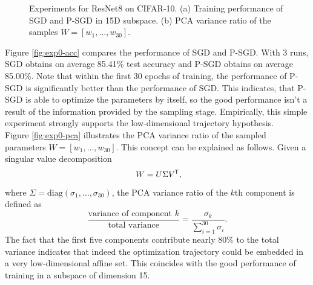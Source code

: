 \documentclass[11pt, a4paper]{article}
\newcommand*{\tr}{^{\mkern-1.5mu\mathsf{T}}}
\begin{document}
\begin{figure}[!h]
\centering
{}
\caption{\centering Experiments for ResNet8 on CIFAR-10. (a) Training performance of SGD and P-SGD in 15D subspace. (b) PCA variance ratio of the samples $W = [w_1, \dots, w_{30}]$. }
\label{fig:exp1}
\end{figure}

Figure \ref{fig:exp0-acc} compares the performance of SGD and P-SGD. With 3 runs, SGD obtains on average 85.41\% test accuracy and P-SGD obtains on average 85.00\%. Note that within the first 30 epochs of training, the performance of P-SGD is significantly better than the performance of SGD.  This indicates, that P-SGD is able to optimize the parameters by itself, so the good performance isn't a result of the information provided by the sampling stage. Empirically, this simple experiment strongly supports the low-dimensional trajectory hypothesis. \\

Figure \ref{fig:exp0-pca} illustrates the PCA variance ratio of the sampled parameters $W = [w_1, \dots, w_{30}]$. This concept can be explained as follows. Given a singular value decomposition
\[ W = U \Sigma V\tr, \]
where $\Sigma = \text{diag}(\sigma_1, \dots, \sigma_{30})$, the PCA variance ratio of the $k$th component is defined as
\[ \frac{\text{variance of component } k}{\text{total variance}} = \frac{\sigma_k}{\sum_{i=1}^{30}\sigma_i}. \]
The fact that the first five components contribute nearly 80\% to the total variance indicates that indeed the optimization trajectory could be embedded in a very low-dimensional affine set. This coincides with the good performance of training in a subspace of dimension 15.
\end{document}
